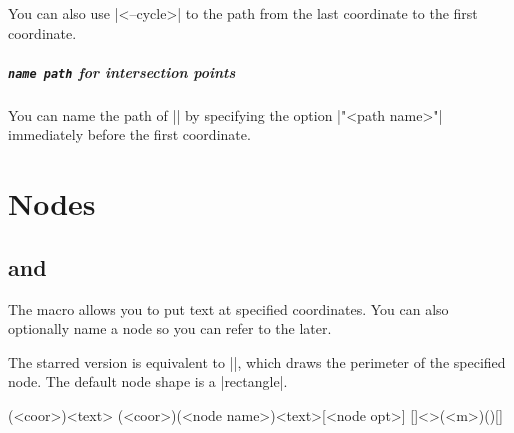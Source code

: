 You can also use |<--cycle>| to  the path  from the last coordinate to the first coordinate.

\begin{tzcode}{.3}
\end{tzcode}

\paragraph{\texttt{name path} for intersection points}
You can name the path of |\tzplotcurve| by specifying the option |"<path name>"| immediately before the first coordinate.

\begin{tzcode}{.3}
\end{tzcode}


\chapter{Nodes}
\label{c:nodes}

\section{\protect\cmd{\tznode} and \protect\cmd{\tznode*}}
\label{s:tznode}

The macro \icmd{\tznode} allows you to put text at specified coordinates.
You can also optionally name a node so you can refer to the  later.

The starred version \icmd{\tznode*} is equivalent to |\tznode[draw]|, which draws the perimeter of the specified node. The default node shape is a |rectangle|.

\begin{tzdef}{}
\tznode(<coor>){<text>}
(<coor>)(<node name>){<text>}[<node opt>]
  []<>(<m>)(){}[]
\end{tzdef}

